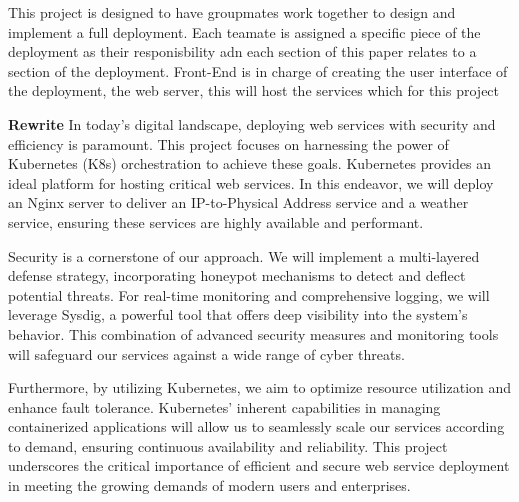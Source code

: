 This project is designed to have groupmates work together to design and implement a full deployment. Each teamate is assigned a specific piece of the deployment as their responisbility adn each section of this paper relates to a section of the deployment. Front-End is in charge of creating the user interface of the deployment, the web server, this will host the services which for this project 

\textbf{Rewrite}
In today's digital landscape, deploying web services with security and efficiency is paramount. This project focuses on harnessing the power of Kubernetes (K8s) orchestration to achieve these goals. Kubernetes provides an ideal platform for hosting critical web services. In this endeavor, we will deploy an Nginx server to deliver an IP-to-Physical Address service and a weather service, ensuring these services are highly available and performant.

Security is a cornerstone of our approach. We will implement a multi-layered defense strategy, incorporating honeypot mechanisms to detect and deflect potential threats. For real-time monitoring and comprehensive logging, we will leverage Sysdig, a powerful tool that offers deep visibility into the system's behavior. This combination of advanced security measures and monitoring tools will safeguard our services against a wide range of cyber threats.

Furthermore, by utilizing Kubernetes, we aim to optimize resource utilization and enhance fault tolerance. Kubernetes’ inherent capabilities in managing containerized applications will allow us to seamlessly scale our services according to demand, ensuring continuous availability and reliability. This project underscores the critical importance of efficient and secure web service deployment in meeting the growing demands of modern users and enterprises.
